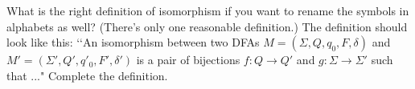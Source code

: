   What is the right definition of isomorphism
  if you want to rename the symbols in alphabets as well?
  (There's only one reasonable definition.)
  The definition should look like this:
  \lq\lq An isomorphism between two DFAs
  $M = (\Sigma, Q, q_0, F, \delta)$
  and
  $M' = (\Sigma', Q', q'_0, F', \delta')$
  is a pair of bijections $f: Q \rightarrow Q'$ and
  $g: \Sigma \rightarrow \Sigma'$ such that ..."
  Complete the definition.
